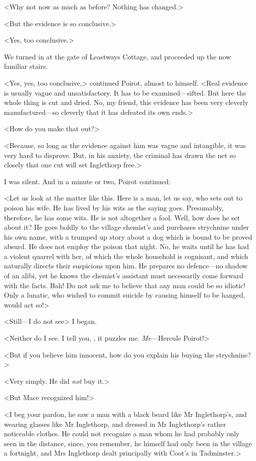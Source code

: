  <Why not now as much as before? Nothing has changed.> 

 <But the evidence is so conclusive.> 

 <Yes, too conclusive.> 

 We turned in at the gate of Leastways Cottage, and proceeded up the now familiar stairs. 

 <Yes, yes, too conclusive,> continued Poirot, almost to himself. <Real evidence is usually vague and unsatisfactory. It has to be examined—sifted. But here the whole thing is cut and dried. No, my friend, this evidence has been very cleverly manufactured—so cleverly that it has defeated its own ends.> 

 <How do you make that out?> 

 <Because, so long as the evidence against him was vague and intangible, it was very hard to disprove. But, in his anxiety, the criminal has drawn the net so closely that one cut will set Inglethorp free.> 

 I was silent. And in a minute or two, Poirot continued: 

 <Let us look at the matter like this. Here is a man, let us say, who sets out to poison his wife. He has lived by his wits as the saying goes. Presumably, therefore, he has some wits. He is not altogether a fool. Well, how does he set about it? He goes boldly to the village chemist's and purchases strychnine under his own name, with a trumped up story about a dog which is bound to be proved absurd. He does not employ the poison that night. No, he waits until he has had a violent quarrel with her, of which the whole household is cognisant, and which naturally directs their suspicions upon him. He prepares no defence—no shadow of an alibi, yet he knows the chemist's assistant must necessarily come forward with the facts. Bah! Do not ask me to believe that any man could be so idiotic! Only a lunatic, who wished to commit suicide by causing himself to be hanged, would act so!> 

 <Still—I do not see\longdash> I began. 

 <Neither do I see. I tell you, , it puzzles me. \emph{Me}—Hercule Poirot!> 

 <But if you believe him innocent, how do you explain his buying the strychnine?> 

 <Very simply. He did \emph{not} buy it.> 

 <But Mace recognized him!> 

 <I beg your pardon, he saw a man with a black beard like Mr Inglethorp's, and wearing glasses like Mr Inglethorp, and dressed in Mr Inglethorp's rather noticeable clothes. He could not recognize a man whom he had probably only seen in the distance, since, you remember, he himself had only been in the village a fortnight, and Mrs Inglethorp dealt principally with Coot's in Tadminster.> 

